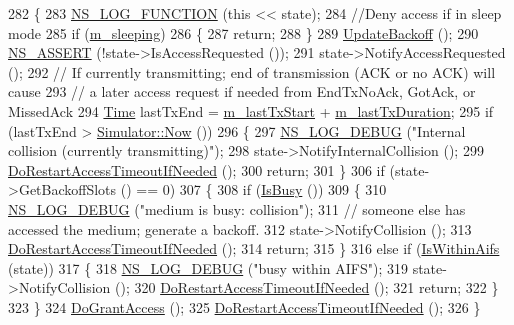 \begin{DoxyCode}
282 \{
283   \hyperlink{log-macros-disabled_8h_a90b90d5bad1f39cb1b64923ea94c0761}{NS\_LOG\_FUNCTION} (\textcolor{keyword}{this} << state);
284   \textcolor{comment}{//Deny access if in sleep mode}
285   \textcolor{keywordflow}{if} (\hyperlink{classns3_1_1DcfManager_aafbdf9bb6a0edaab12b82b6efa42ee93}{m\_sleeping})
286     \{
287       \textcolor{keywordflow}{return};
288     \}
289   \hyperlink{classns3_1_1DcfManager_a8fb01b9608eeab857a38935045fd98b8}{UpdateBackoff} ();
290   \hyperlink{assert_8h_a6dccdb0de9b252f60088ce281c49d052}{NS\_ASSERT} (!state->IsAccessRequested ());
291   state->NotifyAccessRequested ();
292   \textcolor{comment}{// If currently transmitting; end of transmission (ACK or no ACK) will cause}
293   \textcolor{comment}{// a later access request if needed from EndTxNoAck, GotAck, or MissedAck}
294   \hyperlink{namespacens3_1_1TracedValueCallback_a7ffd3e7c142ffe7c8a1d2db9b8de38ec}{Time} lastTxEnd = \hyperlink{classns3_1_1DcfManager_abaae67a660545bd187548f4cc349b8fd}{m\_lastTxStart} + \hyperlink{classns3_1_1DcfManager_ac64d741d745e0cc4930e58a0cee5be31}{m\_lastTxDuration};
295   \textcolor{keywordflow}{if} (lastTxEnd > \hyperlink{classns3_1_1Simulator_ac3178fa975b419f7875e7105be122800}{Simulator::Now} ())
296     \{
297       \hyperlink{group__logging_ga413f1886406d49f59a6a0a89b77b4d0a}{NS\_LOG\_DEBUG} (\textcolor{stringliteral}{"Internal collision (currently transmitting)"});
298       state->NotifyInternalCollision ();
299       \hyperlink{classns3_1_1DcfManager_a26764cee2de83e5293284ee40e447506}{DoRestartAccessTimeoutIfNeeded} ();
300       \textcolor{keywordflow}{return};
301     \}
306   \textcolor{keywordflow}{if} (state->GetBackoffSlots () == 0)
307     \{
308       \textcolor{keywordflow}{if} (\hyperlink{classns3_1_1DcfManager_a999e1243d1fb59c3d3a4b06e143782d8}{IsBusy} ())
309         \{
310           \hyperlink{group__logging_ga413f1886406d49f59a6a0a89b77b4d0a}{NS\_LOG\_DEBUG} (\textcolor{stringliteral}{"medium is busy: collision"});
311           \textcolor{comment}{// someone else has accessed the medium; generate a backoff.}
312           state->NotifyCollision ();
313           \hyperlink{classns3_1_1DcfManager_a26764cee2de83e5293284ee40e447506}{DoRestartAccessTimeoutIfNeeded} ();
314           \textcolor{keywordflow}{return};
315         \}
316       \textcolor{keywordflow}{else} \textcolor{keywordflow}{if} (\hyperlink{classns3_1_1DcfManager_a77fe675d87a17ce5d6a858badb5e4c74}{IsWithinAifs} (state))
317         \{
318           \hyperlink{group__logging_ga413f1886406d49f59a6a0a89b77b4d0a}{NS\_LOG\_DEBUG} (\textcolor{stringliteral}{"busy within AIFS"});
319           state->NotifyCollision ();
320           \hyperlink{classns3_1_1DcfManager_a26764cee2de83e5293284ee40e447506}{DoRestartAccessTimeoutIfNeeded} ();
321           \textcolor{keywordflow}{return};
322         \}
323     \}
324   \hyperlink{classns3_1_1DcfManager_ada5b0a54a00b77705d638b6ef457ba13}{DoGrantAccess} ();
325   \hyperlink{classns3_1_1DcfManager_a26764cee2de83e5293284ee40e447506}{DoRestartAccessTimeoutIfNeeded} ();
326 \}
\end{DoxyCode}



